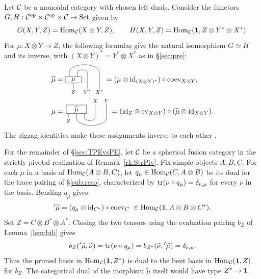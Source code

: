 \documentclass{amsart}
\begin{document}
\begin{definition}\label{def:213}
Let $\mathcal{C}$ be a monoidal category with chosen left duals. Consider the functors
$G,H:\mathcal{C}^{\mathrm{op}}\times\mathcal{C}^{\mathrm{op}}\times\mathcal{C}\to\mathrm{Set}$ given by
\[
 G(X,Y,Z)=\mathrm{Hom}_{\mathcal{C}}(X\otimes Y,Z),\qquad
 H(X,Y,Z)=\mathrm{Hom}_{\mathcal{C}}({\bf 1},Z\otimes Y^*\otimes X^*).
\]
For $\mu:X\otimes Y\to Z$, the following formulas give the natural isomorphism $G\simeq H$ and its inverse, with $(X\otimes Y)^*=Y^*\otimes X^*$ as in \S\ref{sec:pre}:
\begin{align}
 \widetilde\mu
 &= \vcenter{\hbox{%
\begin{tikzpicture}[every node/.style={font=\scriptsize,inner sep=1.5pt}]
\draw (-.2,0)--(-.2,.37) arc (180:0:.74 and .37) --(1.28,-.44) node[below] {$X^*$};
\draw (.2,0)--(.2,.37) arc (180:0:.24 and .12) --(.68,-.44) node[below] {$Y^*$};
\draw (0,0)--(0,-.44) node[below] {$Z$};
\node[draw,fill=white,minimum width=.8cm,font=\small] at (0,0) {$\mu$};
\end{tikzpicture}}} =
   (\mu\otimes\id_{(X\otimes Y)^*})\circ\coev_{X\otimes Y},
   \label{eq:tilde-algebraic}\\*
 \mu
 &= \vcenter{\hbox{%
\begin{tikzpicture}[every node/.style={font=\scriptsize,inner sep=1.5pt}]
\draw (.4,0)--(.4,-.42) arc (-180:0:.26 and .13) --(.92,.28) node[above] {$X$};
\draw (0,0)--(0,-.42) arc (-180:0:.74 and .37) --(1.48,.28) node[above] {$Y$};
\draw (-.4,0)--(-.4,-.42) node[below] {$Z$};
\node[draw,fill=white,minimum width=1cm,font=\small] at (0,0) {$\widetilde\mu$};
\end{tikzpicture}}} =
   (\id_Z\otimes\ev_{X\otimes Y})
      \circ(\widetilde\mu\otimes\id_{X\otimes Y}).\notag
\end{align}
The zigzag identities make these assignments inverse to each other \cite[Proposition~2.10.8]{EGNO15}.
\end{definition}

For the remainder of \S\ref{sec:TPEvsPE}, let $\mathcal{C}$ be a spherical fusion category in the strictly pivotal realization of Remark~\ref{rk:StrPiv}. Fix simple objects $A,B,C$. For each $\mu$ in a basis of $\mathrm{Hom}_{\mathcal{C}}(A\otimes B,C)$, let $q_\mu\in\mathrm{Hom}_{\mathcal{C}}(C,A\otimes B)$ be its dual for the trace pairing of \S\ref{sub:reso}, characterized by $\mathrm{tr}(\nu\circ q_\mu)=\delta_{\nu,\mu}$ for every $\nu$ in the basis. Bending $q_\mu$ gives
\begin{equation}\label{eq:right-tilde-pivotal}
 {}'\widetilde\mu=(q_\mu\otimes\mathrm{id}_{C^*})\circ\mathrm{coev}_C
 \ \in\mathrm{Hom}_{\mathcal{C}}({\bf 1},A\otimes B\otimes C^*).
\end{equation}
Set $Z=C\otimes B^*\otimes A^*$. Closing the two tensors using the evaluation pairing $b_Z$ of Lemma~\ref{lem:bili} gives
\[
 b_Z({}'\widetilde\mu,\widetilde\nu)
 =\mathrm{tr}(\nu\circ q_\mu)
 =b_{Z^*}(\widetilde\nu,{}'\widetilde\mu)=\delta_{\nu,\mu}.
\]
Thus the primed basis in $\mathrm{Hom}_{\mathcal{C}}({\bf 1},Z^*)$ is dual to the bent basis in $\mathrm{Hom}_{\mathcal{C}}({\bf 1},Z)$ for $b_Z$. The categorical dual of the morphism $\widetilde\mu$ itself would have type $Z^*\to{\bf 1}$.
\end{document}

